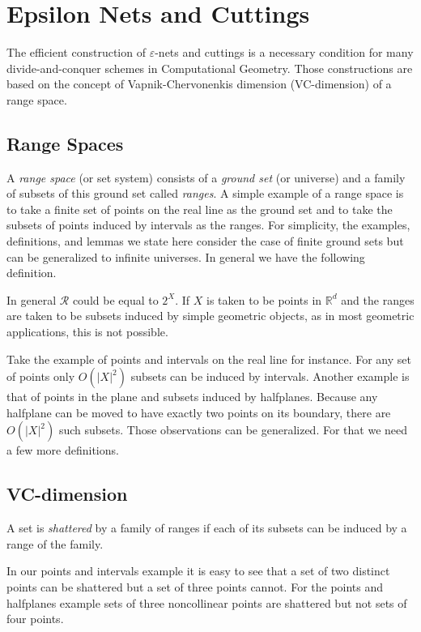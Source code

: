 \section{Epsilon Nets and Cuttings}%
\label{sec:divide-and-conquer:epsilon-nets-and-cuttings}

The efficient construction of \(\varepsilon\)-nets and cuttings
is a necessary condition for many divide-and-conquer schemes
in Computational Geometry.
%
Those constructions are based on the concept
of Vapnik-Chervonenkis dimension
(VC-dimension) of a range space.

\subsection{Range Spaces}

A \emph{range space} (or set system) consists of a \emph{ground set} (or universe) and a family of
subsets of this ground set called \emph{ranges}.
%
A simple example of a range space is to take a finite set of points on the real
line as the ground set and to take the subsets of points induced by intervals
as the ranges.
%
For simplicity, the examples, definitions, and lemmas
we state here consider the case of finite
ground sets but can be generalized to infinite universes.
%
In general we have the following definition.
%


In general \(\mathcal{R}\) could be equal to \(2^{X}\).
%
If \(X\) is taken to be points in \(\mathbb{R}^d\) and the ranges are taken to
be subsets induced by simple geometric objects, as in most geometric
applications, this is not possible.

Take the example of points and intervals on the real line for instance.
For any set of points only \(O({| X |}^2)\) subsets can be induced by
intervals.
%
Another example is that of points in the
plane and subsets induced by halfplanes. Because any halfplane can be moved to
have exactly two points on its boundary, there are \(O({| X |}^2)\) such subsets.
%
Those observations can be generalized. For that we need a few more definitions.

\subsection{VC-dimension}

A set is \emph{shattered} by a family of ranges if each of its subsets can be induced by a
range of the family.

%
In our points and intervals example it is easy to see that a set of two
distinct points
can be shattered but a set of three points cannot.
%
For the points and halfplanes example sets of three noncollinear points are
shattered but not sets of four points.

